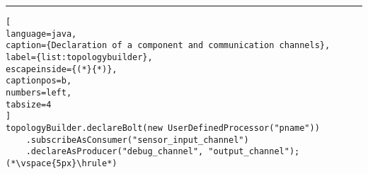 \begin{small}
\vspace{8px}\hrule
\begin{lstlisting}[
language=java, 
caption={Declaration of a component and communication channels}, 
label={list:topologybuilder}, 
escapeinside={(*}{*)}, 
captionpos=b,
numbers=left,
tabsize=4
]
topologyBuilder.declareBolt(new UserDefinedProcessor("pname"))
	.subscribeAsConsumer("sensor_input_channel")
	.declareAsProducer("debug_channel", "output_channel");(*\vspace{5px}\hrule*)
\end{lstlisting}
\end{small}
